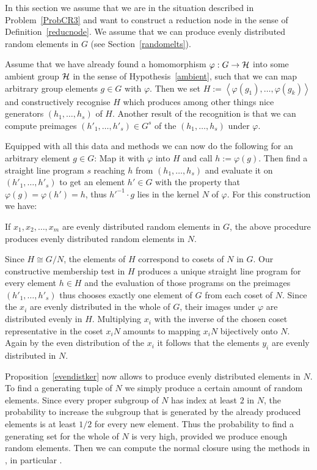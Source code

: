 In this section we assume that we are in the situation described in
Problem~\ref{ProbCR3} and want to construct a reduction node in the sense
of Definition~\ref{reducnode}. We assume that we can produce evenly
distributed random elements in $G$ (see Section~\ref{randomelts}).

Assume that we have already found a homomorphism
$\varphi : G \to \mathcal{H}$ into some ambient group $\mathcal{H}$ in the sense of
Hypothesis~\ref{ambient}, such that we can map arbitrary group elements
$g \in G$ with $\varphi$. Then we set $H := \left< \varphi(g_1), \ldots,
\varphi(g_k) \right>$ and constructively recognise $H$ which produces
among other things nice generators $(h_1, \ldots, h_s)$ of $H$. Another
result of the recognition is that we can compute preimages $(h'_1, \ldots,
h'_s) \in G^s$ of the $(h_1, \ldots, h_s)$ under $\varphi$.

Equipped with all this data and methods we can now do the following
for an arbitrary element $g \in G$: Map it with $\varphi$ into $H$
and call $h := \varphi(g)$. Then find a straight line program $s$ reaching
$h$ from $(h_1, \ldots, h_s)$ and evaluate it on $(h'_1, \ldots, h'_s)$
to get an element $h' \in G$ with the property that
$\varphi(g)=\varphi(h') = h$, thus $h'^{-1}\cdot g$ lies in the kernel $N$
of $\varphi$. For this construction we have:

\begin{Prop}
\label{evendistker}
If $x_1, x_2, \ldots, x_m$ are evenly distributed random elements in $G$,
the above procedure produces evenly distributed random elements in
$N$.
\end{Prop}
\proofbeg
Since $H \cong G/N$, the elements of $H$ correspond to cosets of $N$ in
$G$. Our constructive membership test in $H$ produces a unique straight
line program for every element $h \in H$ and the evaluation of those
programs on the preimages $(h'_1, \ldots, h'_s)$ thus chooses exactly one
element of $G$ from each coset of $N$. Since the $x_i$ are evenly
distributed in the whole of $G$, their images under $\varphi$ are
distributed evenly in $H$. Multiplying $x_i$ with the inverse of the
chosen coset representative in the coset $x_iN$ amounts to mapping
$x_i N$ bijectively onto $N$. Again by the even distribution of the $x_i$
it follows that the elements $y_i$ are evenly distributed in $N$.
\proofend

\smallskip
Proposition~\ref{evendistker} now allows to produce evenly distributed
elements in $N$. To find a generating tuple of $N$ we simply produce
a certain amount of random elements. Since every proper subgroup of $N$ 
has index at least $2$ in $N$, the probability to increase the
subgroup that is generated by the already produced elements is at least 
$1/2$ for every new element. Thus the probability to find a generating
set for the whole of $N$ is very high, provided we produce enough random
elements. Then we can compute the normal closure using
the methods in \cite[Chapter 2]{Ser}, in particular
\cite[Theorem~2.3.9]{Ser}.


